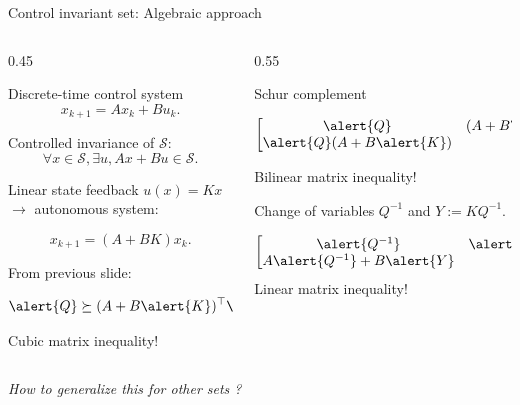 \documentclass[9pt,notes=hide]{beamer}
\begin{document}
\begin{frame}{Control invariant set: Algebraic approach}
  \begin{columns}
    \begin{column}{0.45\textwidth}
      \begin{block}{Discrete-time control system}
        \[ x_{k+1} = Ax_k + Bu_k. \]
      \end{block}

        Controlled invariance of $\mathcal{S}$:
        \[ \forall x \in \mathcal{S}, \exists u, A x + B u \in \mathcal{S}. \]

        \begin{block}{Linear state feedback}
          $u(x) = Kx$ $\to$ autonomous system:

          \vspace{-2em}
          \[
            x_{k+1} = (A + BK) x_k.
          \]
          \vspace{-2em}

          From previous slide:

          \vspace{-2em}
          \[
            \alert{Q} \succeq (A + B\alert{K})^\Tr \alert{Q} (A + B\alert{K}).
          \]
          \vspace{-2em}

          \alert{Cubic} matrix inequality!
        \end{block}
    \end{column}
    \begin{column}{0.55\textwidth}
      \begin{block}{Schur complement}

        \[
          \begin{bmatrix}
            \alert{Q} & (A + B\alert{K})^\Tr \alert{Q}\\
            \alert{Q}(A + B\alert{K}) & \alert{Q}
          \end{bmatrix} \succeq 0.
        \]

        \alert{Bilinear} matrix inequality!
      \end{block}
      \begin{block}{Change of variables}
        $Q^{-1}$ and $Y := KQ^{-1}$.

        \[
          \begin{bmatrix}
            \alert{Q^{-1}} & \alert{Q^{-1}}A^\Tr + \alert{Y}^\Tr B^\Tr\\
            A\alert{Q^{-1}} + B\alert{Y} & \alert{Q^{-1}}
          \end{bmatrix} \succeq 0.
        \]
        \alert{Linear} matrix inequality!
      \end{block}
    \end{column}
  \end{columns}
  \begin{center}
    \emph{How to generalize this for other sets ?}
  \end{center}
\end{frame}
\end{document}
